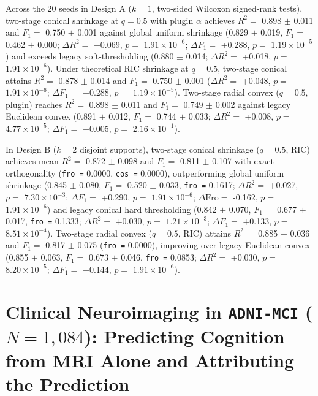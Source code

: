 \documentclass[
  10pt,
  letterpaper,
]{report}
\begin{document}
Across the 20 seeds in Design A (\(k = 1\), two-sided Wilcoxon
signed-rank tests), two-stage conical shrinkage at \(q = 0.5\) with
plugin \(\alpha\) achieves \(R^2 =\) 0.898 \(\pm\) 0.011 and \(F_1 =\)
0.750 \(\pm\) 0.001 against global uniform shrinkage (0.829 \(\pm\)
0.019, \(F_1 =\) 0.462 \(\pm\) 0.000; \(\Delta R^2 =\) +0.069, \(p =\)
\(1.91 \times 10^{-6}\); \(\Delta F_1 =\) +0.288, \(p =\)
\(1.19 \times 10^{-5}\)) and exceeds legacy soft-thresholding (0.880
\(\pm\) 0.014; \(\Delta R^2 =\) +0.018, \(p =\)
\(1.91 \times 10^{-6}\)). Under theoretical RIC shrinkage at
\(q = 0.5\), two-stage conical attains \(R^2 =\) 0.878 \(\pm\) 0.014 and
\(F_1 =\) 0.750 \(\pm\) 0.001 (\(\Delta R^2 =\) +0.048, \(p =\)
\(1.91 \times 10^{-6}\); \(\Delta F_1 =\) +0.288, \(p =\)
\(1.19 \times 10^{-5}\)). Two-stage radial convex (\(q = 0.5\), plugin)
reaches \(R^2 =\) 0.898 \(\pm\) 0.011 and \(F_1 =\) 0.749 \(\pm\) 0.002
against legacy Euclidean convex (0.891 \(\pm\) 0.012, \(F_1 =\) 0.744
\(\pm\) 0.033; \(\Delta R^2 =\) +0.008, \(p =\) \(4.77 \times 10^{-5}\);
\(\Delta F_1 =\) +0.005, \(p =\) \(2.16 \times 10^{-1}\)).

In Design B (\(k = 2\) disjoint supports), two-stage conical shrinkage
(\(q = 0.5\), RIC) achieves mean \(R^2 =\) 0.872 \(\pm\) 0.098 and
\(F_1 =\) 0.811 \(\pm\) 0.107 with exact orthogonality (\texttt{fro\ =}
0.0000, \texttt{cos\ =} 0.0000), outperforming global uniform shrinkage
(0.845 \(\pm\) 0.080, \(F_1 =\) 0.520 \(\pm\) 0.033, \texttt{fro\ =}
0.1617; \(\Delta R^2 =\) +0.027, \(p =\) \(7.30 \times 10^{-3}\);
\(\Delta F_1 =\) +0.290, \(p =\) \(1.91 \times 10^{-6}\);
\(\Delta \text{Fro} =\) -0.162, \(p =\) \(1.91 \times 10^{-6}\)) and
legacy conical hard thresholding (0.842 \(\pm\) 0.070, \(F_1 =\) 0.677
\(\pm\) 0.017, \texttt{fro\ =} 0.1333; \(\Delta R^2 =\) +0.030, \(p =\)
\(1.21 \times 10^{-3}\); \(\Delta F_1 =\) +0.133, \(p =\)
\(8.51 \times 10^{-4}\)). Two-stage radial convex (\(q = 0.5\), RIC)
attains \(R^2 =\) 0.885 \(\pm\) 0.036 and \(F_1 =\) 0.817 \(\pm\) 0.075
(\texttt{fro\ =} 0.0000), improving over legacy Euclidean convex (0.855
\(\pm\) 0.063, \(F_1 =\) 0.673 \(\pm\) 0.046, \texttt{fro\ =} 0.0853;
\(\Delta R^2 =\) +0.030, \(p =\) \(8.20 \times 10^{-5}\);
\(\Delta F_1 =\) +0.144, \(p =\) \(1.91 \times 10^{-6}\)).

\section{\texorpdfstring{Clinical Neuroimaging in \texttt{ADNI-MCI}
(\(N = 1,084\)): Predicting Cognition from MRI Alone and Attributing the
Prediction}{Clinical Neuroimaging in ADNI-MCI (N = 1,084): Predicting Cognition from MRI Alone and Attributing the Prediction}}\label{clinical-neuroimaging-in-adni-mci-n-1084-predicting-cognition-from-mri-alone-and-attributing-the-prediction}
\end{document}
